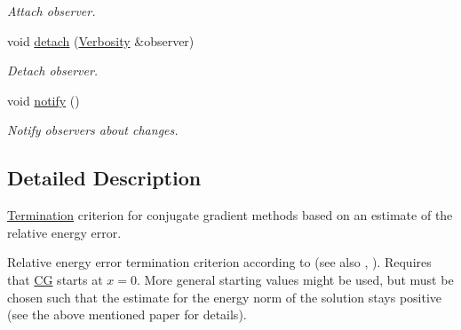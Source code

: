 \begin{DoxyCompactItemize}
\begin{DoxyCompactList}\small\item\em \-Attach observer. \end{DoxyCompactList}\item 
\hypertarget{classSpacy_1_1Mixin_1_1MixinConnection_adda739590c487679c26f60e50aedb73f}{void \hyperlink{classSpacy_1_1Mixin_1_1MixinConnection_adda739590c487679c26f60e50aedb73f}{detach} (\hyperlink{classSpacy_1_1Mixin_1_1Verbosity_aefe2f237b0456c4bced001fbfa75f92e}{\-Verbosity} \&observer)}\label{classSpacy_1_1Mixin_1_1MixinConnection_adda739590c487679c26f60e50aedb73f}

\begin{DoxyCompactList}\small\item\em \-Detach observer. \end{DoxyCompactList}\item 
\hypertarget{classSpacy_1_1Mixin_1_1MixinConnection_a1ddeaa78a3bb4a38c2cca36d1f99fe36}{void \hyperlink{classSpacy_1_1Mixin_1_1MixinConnection_a1ddeaa78a3bb4a38c2cca36d1f99fe36}{notify} ()}\label{classSpacy_1_1Mixin_1_1MixinConnection_a1ddeaa78a3bb4a38c2cca36d1f99fe36}

\begin{DoxyCompactList}\small\item\em \-Notify observers about changes. \end{DoxyCompactList}\end{DoxyCompactItemize}


\subsection{\-Detailed \-Description}
\hyperlink{namespaceSpacy_1_1CG_1_1Termination}{\-Termination} criterion for conjugate gradient methods based on an estimate of the relative energy error. 

\-Relative energy error termination criterion according to \cite{Strakos2005} (see also \cite{Hestenes1952}, \cite{Arioli2004}). \-Requires that \hyperlink{namespaceSpacy_1_1CG}{\-C\-G} starts at $ x = 0 $. \-More general starting values might be used, but must be chosen such that the estimate for the energy norm of the solution stays positive (see the above mentioned paper for details). 

